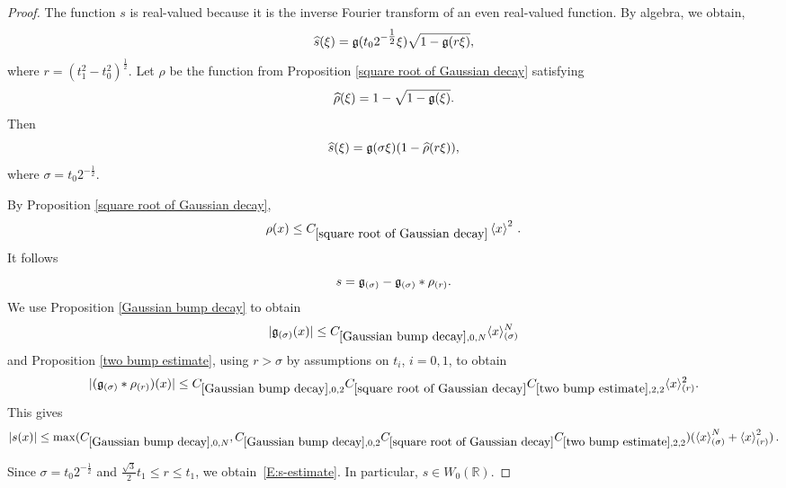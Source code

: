 \documentclass[12pt,reqno]{amsart}
\theoremstyle{plain}
\numberwithin{equation}{section}
\theoremstyle{remark}
\newcommand{\R}{{\mathbb R}}
\begin{document}
\begin{proof}
The function $s$ is real-valued because it is the inverse Fourier transform of an even real-valued function.
By algebra, we obtain,
\begin{equation}\label{dsr5}
    \widehat{s}(\xi) = \mathfrak{g}(t_02^{-\tfrac12} \xi) \sqrt{1 - \mathfrak{g}(r \xi)},
\end{equation}
where $r=(t_1^2-t_0^2)^{\frac 12}$.
Let $\rho$ be the function from Proposition \ref{square root of Gaussian decay} satisfying
\begin{equation}
    \widehat{\rho}(\xi)=1- \sqrt{1-\mathfrak{g}(\xi)}.
\end{equation}
Then
\begin{equation}
\widehat{s}(\xi) = \mathfrak{g}(\sigma\xi)(1-\widehat{\rho}(r\xi)),
\end{equation}
where $\sigma=t_0 2^{-\frac 12}$.

By Proposition \ref{square root of Gaussian decay},
\begin{equation}\label{dsr7}
    \rho(x)\le C_{\ref{square root of Gaussian decay}} \left<x\right>^2\, .
\end{equation}
It follows
\begin{equation}
    s=\mathfrak{g}_{(\sigma)} - \mathfrak{g}_{(\sigma)}*\rho_{(r)}.
\end{equation}
We use Proposition \ref{Gaussian bump decay} to obtain
\[|\mathfrak{g}_{(\sigma)}(x)|\le C_{\ref{Gaussian bump decay},0,N} \langle x \rangle_{(\sigma)}^N\]
and Proposition \ref{two bump estimate}, using $r>\sigma$
by assumptions on $t_i$, $i=0,1$, to obtain
\[|(\mathfrak{g}_{(\sigma)}*\rho_{(r)})(x)|\le C_{\ref{Gaussian bump decay},0,2}C_{\ref{square root of Gaussian decay}}C_{\ref{two bump estimate},2,2} \langle x \rangle_{(r)}^2.\]
 This gives
\begin{equation}
    |s(x)|\le \max(C_{\ref{Gaussian bump decay},0,N}, C_{\ref{Gaussian bump decay},0,2}C_{\ref{square root of Gaussian decay}}C_{\ref{two bump estimate},2,2}) (\left<x\right>_{(\sigma)}^{N} +  \left<x\right>_{(r)}^2)\, .
\end{equation}

Since $\sigma=t_0 2^{-\frac12}$ and $\frac{\sqrt{3}}{2}t_1\le r\le t_1$, we obtain~\eqref{E:s-estimate}. In particular, $s\in W_0(\R)$.
 \end{proof}
\end{document}
